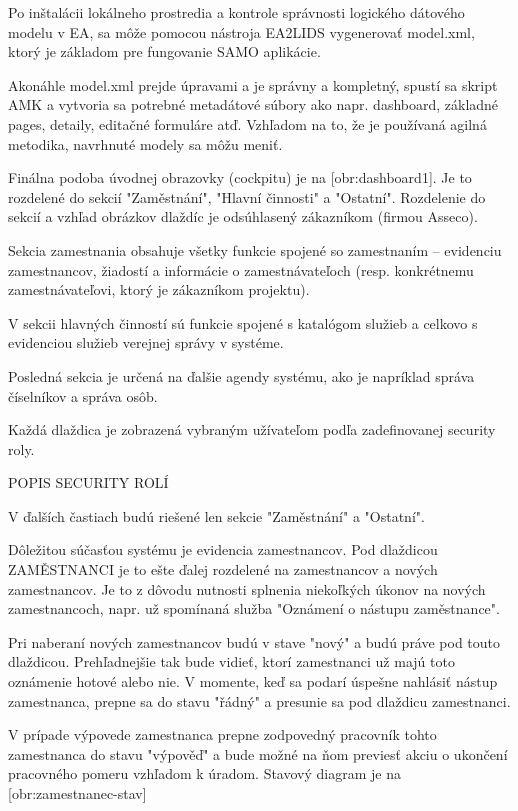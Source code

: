 Po inštalácii lokálneho prostredia a kontrole správnosti logického dátového modelu v EA, sa môže pomocou nástroja EA2LIDS vygenerovať model.xml, ktorý je základom pre fungovanie SAMO aplikácie. 

Akonáhle model.xml prejde úpravami a je správny a kompletný, spustí sa skript AMK a vytvoria sa potrebné metadátové súbory ako napr. dashboard, základné pages, detaily, editačné formuláre atď. Vzhľadom na to, že je používaná agilná metodika, navrhnuté modely sa môžu meniť.

Finálna podoba úvodnej obrazovky (cockpitu) je na [obr:dashboard1]. Je to rozdelené do sekcií "Zaměstnání", "Hlavní činnosti" a "Ostatní". Rozdelenie do sekcií a vzhľad obrázkov dlaždíc je odsúhlasený zákazníkom (firmou Asseco).

Sekcia zamestnania obsahuje všetky funkcie spojené so zamestnaním -- evidenciu zamestnancov, žiadostí a informácie o zamestnávateľoch (resp. konkrétnemu zamestnávateľovi, ktorý je zákazníkom projektu). 

V sekcii hlavných činností sú funkcie spojené s katalógom služieb a celkovo s evidenciou služieb verejnej správy v systéme. 

Posledná sekcia je určená na ďalšie agendy systému, ako je napríklad správa číselníkov a správa osôb.

Každá dlaždica je zobrazená vybraným užívateľom podľa zadefinovanej security roly. 

\TODO POPIS SECURITY ROLÍ

V ďalších častiach budú riešené len sekcie "Zaměstnání" a "Ostatní". 

Dôležitou súčasťou systému je evidencia zamestnancov. Pod dlaždicou \zlom ZAMĚSTNANCI je to ešte ďalej rozdelené na zamestnancov a nových zamestnancov. Je to z dôvodu nutnosti splnenia niekoľkých úkonov na nových zamestnancoch, napr. už spomínaná služba "Oznámení o nástupu zaměstnance". 

Pri naberaní nových zamestnancov budú v stave "nový" a budú práve pod touto dlaždicou. Prehľadnejšie tak bude vidieť, ktorí zamestnanci už majú toto oznámenie hotové alebo nie. V momente, keď sa podarí úspešne nahlásiť nástup zamestnanca, prepne sa do stavu "řádný" a presunie sa pod dlaždicu zamestnanci. 

V prípade výpovede zamestnanca prepne zodpovedný pracovník tohto zamestnanca do stavu "výpověď" a bude možné na ňom previesť akciu o ukončení pracovného pomeru vzhľadom k úradom. Stavový diagram je na [obr:zamestnanec-stav]

